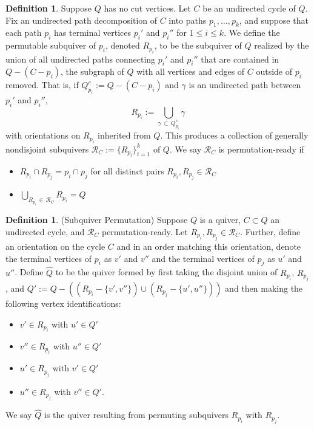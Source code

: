 \documentclass[12pt]{amsart}
\theoremstyle{plain}
\theoremstyle{definition}
\newtheorem{definition}[theorem]{Definition}
\begin{document}
\begin{definition}
Suppose $Q$ has no cut vertices. Let $C$ be an undirected cycle of $Q$. Fix an undirected path decomposition of $C$ into paths $p_1, \ldots, p_k$, and suppose that each path $p_i$ has terminal vertices $p_i'$ and $p_i''$ for $1 \leq i \leq k$. We define the permutable subquiver of $p_i$, denoted $R_{p_i}$, to be the subquiver of $Q$ realized by the union of all undirected paths connecting $p_i'$ and $p_i''$ that are contained in $Q - (C - p_i)$, the subgraph of $Q$ with all vertices and edges of $C$ outside of $p_i$ removed. That is, if $Q^c_{p_i} := Q - (C - p_i)$ and $\gamma$ is an undirected path between $p_i'$ and $p_i''$,
\[
R_{p_i} := \bigcup_{\gamma \,\subset\, Q^c_{p_i}}\gamma
\]
with orientations on $R_{p_i}$ inherited from $Q$.
This produces a collection of generally nondisjoint subquivers $\mathcal{R}_C := \{R_{p_i}\}^k_{i=1}$ of $Q$.
We say $\mathcal{R}_C$ is permutation-ready if
\begin{itemize}
    \item[(i)] $R_{p_i} \cap R_{p_j} = p_i \cap p_j$ for all distinct pairs $R_{p_i}, R_{p_j} \in \mathcal{R}_C$
    \item[(ii)]$\bigcup_{R_{p_i} \,\in\,\mathcal{R}_C }R_{p_i} = Q$
\end{itemize}
\end{definition}

\begin{definition} \label{subquiver_permutation}
    (Subquiver Permutation) Suppose $Q$ is a quiver, $C \subset Q$ an undirected cycle, and $\mathcal{R}_C$ permutation-ready. Let $R_{p_i}, R_{p_j} \in \mathcal{R}_C$. Further, define an orientation on the cycle $C$ and in an order matching this orientation, denote the terminal vertices of $p_i$ as $v'$ and $v''$ and the terminal vertices of $p_j$ as $u'$ and $u''$. Define $\hat Q$ to be the quiver formed by first taking the disjoint union of $R_{p_i}$, $R_{p_j}$, and $Q' := Q - ((R_{p_i} - \{v', v''\}) \cup (R_{p_j} - \{u', u''\}))$ and then making the following vertex identifications:
    \begin{itemize}
        \item[(i)] $v' \in R_{p_i}$ with $u' \in Q'$
        \item[(ii)] $v'' \in R_{p_i}$ with $u'' \in Q'$
        \item[(iii)] $u' \in R_{p_j}$ with $v' \in Q'$
        \item[(iv)] $u'' \in R_{p_j}$ with $v'' \in Q'$.
    \end{itemize}
    We say $\hat Q$ is the quiver resulting from permuting subquivers $R_{p_i}$ with $R_{p_j}$.
\end{definition}
\end{document}
